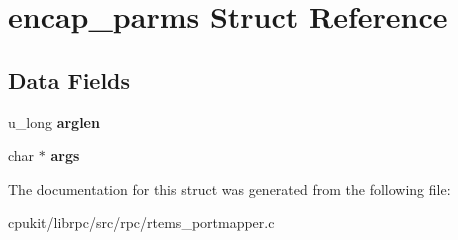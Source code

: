 \hypertarget{structencap__parms}{}\section{encap\+\_\+parms Struct Reference}
\label{structencap__parms}
\subsection*{Data Fields}
\begin{DoxyCompactItemize}
\item 
\mbox{\label{structencap__parms_ad22163fbfd6a089418177611e97801af}} 
u\+\_\+long {\bfseries arglen}
\item 
\mbox{\label{structencap__parms_ac6c8152b16e9c01b6b39926754c8fdf8}} 
char $\ast$ {\bfseries args}
\end{DoxyCompactItemize}


The documentation for this struct was generated from the following file\+:\begin{DoxyCompactItemize}
\item 
cpukit/librpc/src/rpc/rtems\+\_\+portmapper.\+c\end{DoxyCompactItemize}
